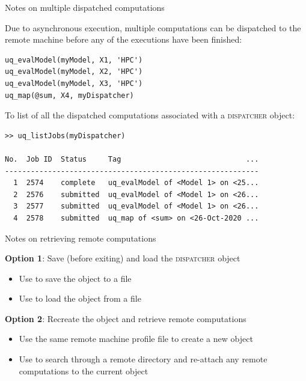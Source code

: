 \documentclass[]{rsuqbeamernew}
\begin{document}
\begin{frame}[fragile]{Notes on multiple dispatched computations}

Due to asynchronous execution, multiple computations can be dispatched to the remote machine
before any of the executions have been finished:
\begin{lstlisting}[numbers=none]
uq_evalModel(myModel, X1, 'HPC')
uq_evalModel(myModel, X2, 'HPC')
uq_evalModel(myModel, X3, 'HPC')
uq_map(@sum, X4, myDispatcher)
\end{lstlisting}

To list of all the dispatched computations associated with a \textsc{dispatcher} object:
\begin{lstlisting}[numbers=none]
>> uq_listJobs(myDispatcher)

No.  Job ID  Status     Tag                             ...                          
-----------------------------------------------------------
  1  2574    complete   uq_evalModel of <Model 1> on <25...
  2  2576    submitted  uq_evalModel of <Model 1> on <26...
  3  2577    submitted  uq_evalModel of <Model 1> on <26...
  4  2578    submitted  uq_map of <sum> on <26-Oct-2020 ...
\end{lstlisting}

\end{frame}

\begin{frame}[fragile]{Notes on retrieving remote computations}

\begin{block}{\textbf{Option 1}: Save (before exiting) and load the \textsc{dispatcher} object}
  \begin{itemize}
    \item Use  to save the object to a file
    \item Use  to load the object from a file
  \end{itemize}
\end{block}

\begin{block}{\textbf{Option 2}: Recreate the object and retrieve remote computations}
  \begin{itemize}
    \item Use the same remote machine profile file to create a new object
    \item Use  to search through a remote directory
          and re-attach any remote computations to the current object
  \end{itemize}
\end{block}


\end{frame}
\end{document}

